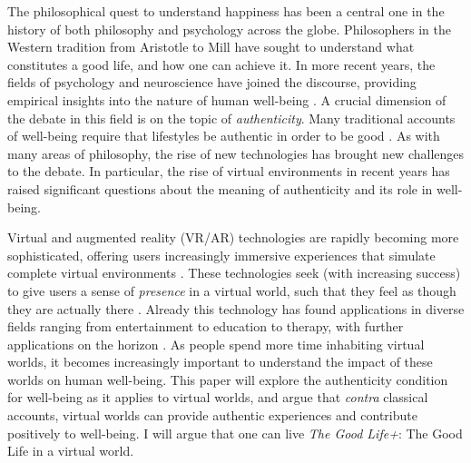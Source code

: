 The philosophical quest to understand happiness has been a central one in the 
history of both philosophy and psychology across the globe. Philosophers in
the Western tradition from Aristotle to Mill have sought to understand what
constitutes a good life, and how one can achieve it. In more recent years, the
fields of psychology and neuroscience have joined the discourse, providing
empirical insights into the nature of human well-being \citep{Stoll2014}. 
A crucial dimension of the debate in this field is on the topic of
\emph{authenticity}. Many traditional accounts of well-being require that
lifestyles be authentic in order to be good \citep{sep-authenticity}. As with 
many areas of philosophy, the rise of new technologies has brought new 
challenges to the debate. In particular, the rise of virtual environments in
recent years has raised significant questions about the meaning of authenticity
and its role in well-being.

Virtual and augmented reality (VR/AR) technologies are rapidly becoming more
sophisticated, offering users increasingly immersive experiences that simulate
complete virtual environments \citep{Wang_Siau_2024}. These technologies seek
(with increasing success) to give users a sense of \emph{presence} in a virtual
world, such that they feel as though they are actually there
\citep{slater2018immersion}. Already this technology has found applications in
diverse fields ranging from entertainment to education to therapy, with further
applications on the horizon \citep{ijerph191811278}. As people spend more time
inhabiting virtual worlds, it becomes increasingly important to understand the
impact of these worlds on human well-being. This paper will explore the
authenticity condition for well-being as it applies to virtual worlds, and argue
that \emph{contra} classical accounts, virtual worlds can provide authentic
experiences and contribute positively to well-being. I will argue that one can
live \emph{The Good Life+}: The Good Life in a virtual world.